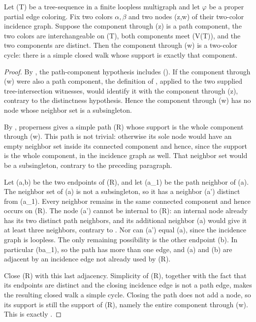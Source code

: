 \begin{helper}
Let (T) be a tree-sequence in a finite loopless multigraph and let
\(\varphi\) be a proper partial edge coloring.  Fix two colors
\(\alpha,\beta\) and two nodes (z,w) of their two-color incidence graph.
Suppose the component through (z) is a path component, the two colors are
interchangeable on (T), both components meet (V(T)), and the two
components are distinct.  Then the component through (w) is a two-color
cycle: there is a simple closed walk whose support is exactly that component.
\end{helper}
\begin{proof}
By , the path-component hypothesis includes
(\alpha\ne\beta).  If the component through (w) were also a path component,
the definition of
, applied to the two supplied tree-intersection
witnesses, would identify it with the component through (z), contrary to
the distinctness hypothesis.  Hence the component through (w) has no node
whose neighbor set is a subsingleton.

By , properness gives a simple path
(R) whose support is the whole component through (w).  This path is not
trivial: otherwise its sole node would have an empty neighbor set inside its
connected component and hence, since the support is the whole component, in
the incidence graph as well.  That neighbor set would be a subsingleton,
contrary to the preceding paragraph.

Let (a,b) be the two endpoints of (R), and let (a_1) be the path neighbor of
(a).  The neighbor set of (a) is not a subsingleton, so it has a neighbor
(a') distinct from (a_1).  Every neighbor remains in the same connected
component and hence occurs on (R).  The node (a') cannot be internal to
(R): an internal node already has its two distinct path neighbors, and its
additional neighbor (a) would give it at least three neighbors, contrary to
.  Nor can (a') equal (a), since
the incidence graph is loopless.  The only remaining possibility is the
other endpoint (b).  In particular (b\ne a_1), so the path has more than one
edge, and (a) and (b) are adjacent by an incidence edge not already used by
(R).

Close (R) with this last adjacency.  Simplicity of (R), together with the
fact that its endpoints are distinct and the closing incidence edge is not a
path edge, makes the resulting closed walk a simple cycle.  Closing the path
does not add a node, so its support is still the support of (R), namely the
entire component through (w).  This is exactly
.
\end{proof}

